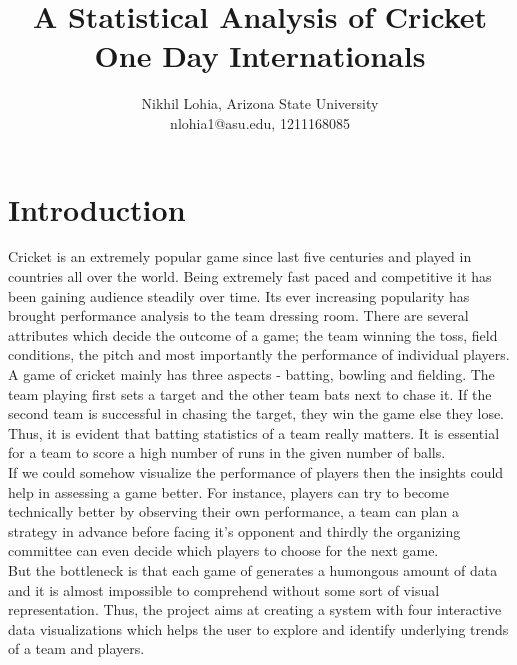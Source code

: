 \documentclass[letterpaper, 10 pt, conference]{ieeeconf}  %
\title{\LARGE \bf
A Statistical Analysis of Cricket One Day Internationals
}
\author{Nikhil Lohia, Arizona State University\\nlohia1@asu.edu, 1211168085}
\begin{document}
\maketitle
\thispagestyle{empty}
\pagestyle{empty}




\section{Introduction}

Cricket is an extremely popular game since last five centuries and played in countries all over the world. Being extremely fast paced and competitive it has been gaining audience steadily over time. Its ever increasing popularity has brought performance analysis to the team dressing room. There are several attributes which decide the outcome of a game; the team winning the toss, field conditions, the pitch and most importantly the performance of individual players. A game of cricket mainly has three aspects - batting, bowling and fielding. The team playing first sets a target and the other team bats next to chase it. If the second team is successful in chasing the target, they win the game else they lose. Thus, it is evident that batting statistics of a team really matters. It is essential for a team to score a high number of runs in the given number of balls.\\ 

\indent If we could somehow visualize the performance of players then the insights could help in assessing a game better. For instance, players can try to become technically better by observing their own performance, a team can plan a strategy in advance before facing it's opponent and thirdly the organizing committee can even decide which players to choose for the next game.\\

\indent But the bottleneck is that each game of generates a humongous amount of data and it is almost impossible to comprehend without some sort of visual representation. Thus, the project aims at creating a system with four interactive data visualizations which helps the user to explore and identify underlying trends of a team and players.\\
\end{document}
